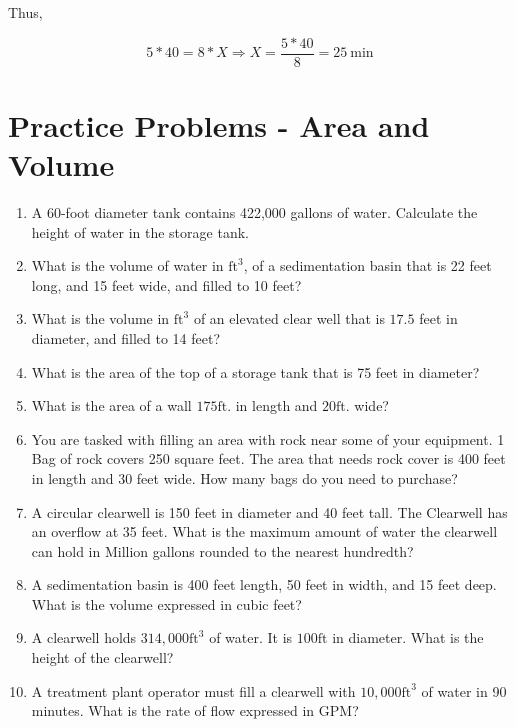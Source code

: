 \documentclass[10pt]{article}
\begin{document}
\begin{enumerate}
\begin{enumerate}
Thus,

$$
5 * 40=8 * X \Longrightarrow X=\frac{5 * 40}{8}=25 \mathrm{~min}
$$

\section{Practice Problems - Area and Volume}
\begin{enumerate}
  \item A 60-foot diameter tank contains 422,000 gallons of water. Calculate the height of water in the storage tank.

  \item What is the volume of water in $\mathrm{ft}^{3}$, of a sedimentation basin that is 22 feet long, and 15 feet wide, and filled to 10 feet?

  \item What is the volume in $\mathrm{ft}^{3}$ of an elevated clear well that is $17.5$ feet in diameter, and filled to 14 feet?

  \item What is the area of the top of a storage tank that is 75 feet in diameter?

  \item What is the area of a wall $175 \mathrm{ft}$. in length and $20 \mathrm{ft}$. wide?

  \item You are tasked with filling an area with rock near some of your equipment. 1 Bag of rock covers 250 square feet. The area that needs rock cover is 400 feet in length and 30 feet wide. How many bags do you need to purchase?

  \item A circular clearwell is 150 feet in diameter and 40 feet tall. The Clearwell has an overflow at 35 feet. What is the maximum amount of water the clearwell can hold in Million gallons rounded to the nearest hundredth?

  \item A sedimentation basin is 400 feet length, 50 feet in width, and 15 feet deep. What is the volume expressed in cubic feet?

  \item A clearwell holds $314,000 \mathrm{ft}^{3}$ of water. It is $100 \mathrm{ft}$ in diameter. What is the height of the clearwell?

  \item A treatment plant operator must fill a clearwell with $10,000 \mathrm{ft}^{3}$ of water in 90 minutes. What is the rate of flow expressed in GPM?


\end{enumerate}
\end{enumerate}
\end{enumerate}
\end{document}

